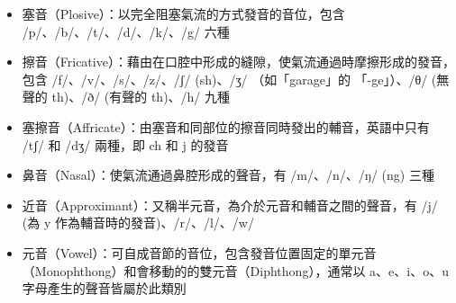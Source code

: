 \begin{itemize}
    \item 塞音（Plosive）：以完全阻塞氣流的方式發音的音位，包含 /p/、/b/、/t/、/d/、/k/、/g/ 六種
    \item 擦音（Fricative）：藉由在口腔中形成的縫隙，使氣流通過時摩擦形成的發音，包含 /f/、/v/、/s/、/z/、/ʃ/ (sh)、/ʒ/ （如「garage」的 「-ge」）、/θ/ (無聲的 th)、/ð/ (有聲的 th)、/h/ 九種
    \item 塞擦音（Affricate）：由塞音和同部位的擦音同時發出的輔音，英語中只有 /tʃ/ 和 /dʒ/ 兩種，即 ch 和 j 的發音
    \item 鼻音（Nasal）：使氣流通過鼻腔形成的聲音，有 /m/、/n/、/ŋ/ (ng) 三種
    \item 近音（Approximant）：又稱半元音，為介於元音和輔音之間的聲音，有 /j/ (為 y 作為輔音時的發音)、/r/、/l/、/w/
    \item 元音（Vowel）：可自成音節的音位，包含發音位置固定的單元音（Monophthong）和會移動的的雙元音（Diphthong），通常以 a、e、i、o、u 字母產生的聲音皆屬於此類別
\end{itemize}











